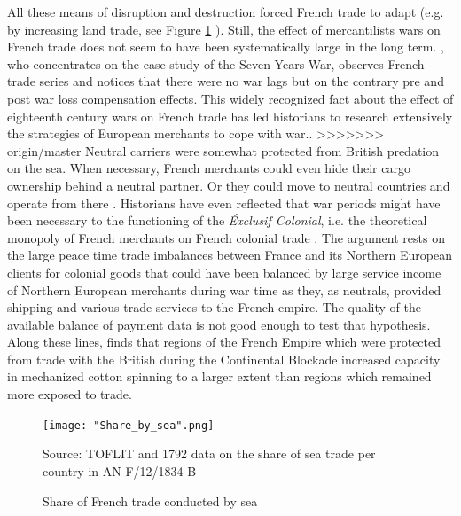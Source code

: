 \documentclass[12pt,a4paper,notitlepage,english]{article}
\newcommand{\source}[1]{\caption*{\footnotesize Source: {#1}} }
\begin{document}
All these means of disruption and destruction forced French trade to adapt (e.g. by increasing land trade, see Figure  \ref{Share_by_sea} ).
Still, the effect of mercantilists wars on French trade does not seem to have been systematically large in the long term.
\cite{Riley1986}, who concentrates on the case study of the Seven Years War, observes French trade series and notices that there were no war lags but on the contrary pre and post war loss compensation effects.
This widely recognized fact about the effect of eighteenth century wars on French trade has led historians to research extensively the strategies of European merchants to cope with war..
>>>>>>> origin/master
Neutral carriers were somewhat protected from British predation on the sea.
When necessary, French merchants could even hide their cargo ownership behind a neutral partner.
Or they could move to neutral countries and operate from there \citep{Marzagalli2016}.
Historians have even reflected that war periods might have been necessary to the functioning of the \textit{Éxclusif Colonial}, i.e. the theoretical monopoly of French merchants on French colonial trade \citep{Lespagnol1997, Morineau1997, Marzagalli2016}.
The argument rests on the large peace time trade imbalances between France and its Northern European clients for colonial goods that could have been balanced by large service income of Northern European merchants during war time as they, as neutrals, provided shipping and various trade services to the French empire.
The quality of the available balance of payment data is not good enough to test that hypothesis.
Along these lines, \cite{Juhasz2018} finds that regions of the French Empire which were protected from trade with the British during the Continental Blockade increased capacity in mechanized cotton spinning to a larger extent than regions which remained more exposed to trade.\\


\begin{figure}
	\caption{Share of French trade conducted by sea}
	\centering
	\texttt{[image: "Share\_by\_sea".png]}
	\source{TOFLIT and 1792 data on the share of sea trade per country in AN F/12/1834 B}
	\label{Share_by_sea}
\end{figure}
\end{document}

